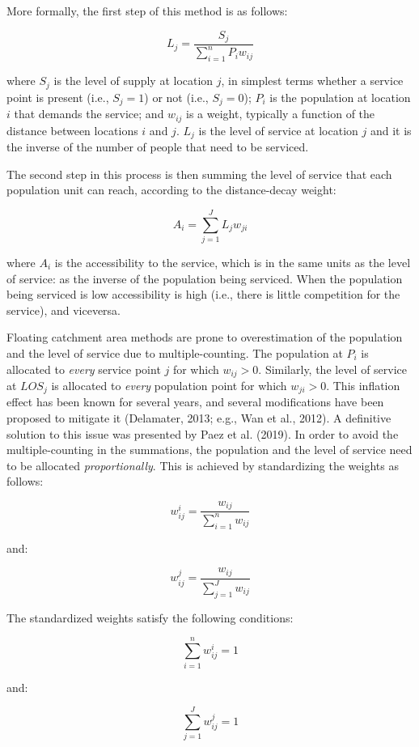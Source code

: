 \documentclass[]{elsarticle} %
\begin{document}
More formally, the first step of this method is as follows:

\[
L_j = \frac{S_j}{\sum_{i=1}^nP_iw_{ij}}
\]

\noindent where \(S_j\) is the level of supply at location \(j\), in
simplest terms whether a service point is present (i.e., \(S_j=1\)) or
not (i.e., \(S_j=0\)); \(P_i\) is the population at location \(i\) that
demands the service; and \(w_{ij}\) is a weight, typically a function of
the distance between locations \(i\) and \(j\). \(L_j\) is the level of
service at location \(j\) and it is the inverse of the number of people
that need to be serviced.

The second step in this process is then summing the level of service
that each population unit can reach, according to the distance-decay
weight:

\[
A_i = \sum_{j=1}^JL_jw_{ji}
\]

\noindent where \(A_i\) is the accessibility to the service, which is in
the same units as the level of service: as the inverse of the population
being serviced. When the population being serviced is low accessibility
is high (i.e., there is little competition for the service), and
viceversa.

Floating catchment area methods are prone to overestimation of the
population and the level of service due to multiple-counting. The
population at \(P_i\) is allocated to \emph{every} service point \(j\)
for which \(w_{ij}>0\). Similarly, the level of service at \(LOS_j\) is
allocated to \emph{every} population point for which \(w_{ji}>0\). This
inflation effect has been known for several years, and several
modifications have been proposed to mitigate it (Delamater, 2013; e.g.,
Wan et al., 2012). A definitive solution to this issue was presented by
Paez et al. (2019). In order to avoid the multiple-counting in the
summations, the population and the level of service need to be allocated
\emph{proportionally}. This is achieved by standardizing the weights as
follows:

\[
w_{ij}^i = \frac{w_{ij}}{\sum_{i=1}^nw_{ij}}
\]

\noindent and:

\[
w_{ij}^j = \frac{w_{ij}}{\sum_{j=1}^Jw_{ij}}
\]

The standardized weights satisfy the following conditions:

\[
\sum_{i=1}^nw_{ij}^i=1
\]

\noindent and:

\[
\sum_{j=1}^Jw_{ij}^j=1
\]
\end{document}

